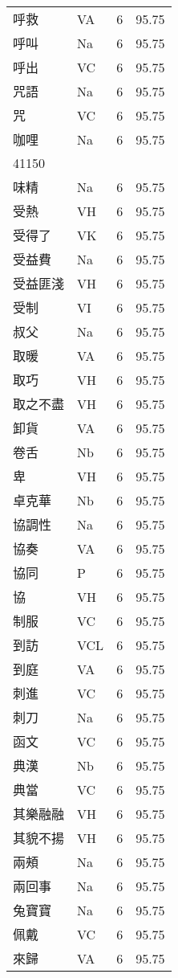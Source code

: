 \documentclass[twocolumn]{book}
\begin{document}
\begin{supertabular}{llrr}
呼救 & VA & 6 &  95.75\\
呼叫 & Na & 6 &  95.75\\
呼出 & VC & 6 &  95.75\\
咒語 & Na & 6 &  95.75\\
咒 & VC & 6 &  95.75\\
咖哩 & Na & 6 &  95.75\\
41150\\
味精 & Na & 6 &  95.75\\
受熱 & VH & 6 &  95.75\\
受得了 & VK & 6 &  95.75\\
受益費 & Na & 6 &  95.75\\
受益匪淺 & VH & 6 &  95.75\\
受制 & VI & 6 &  95.75\\
叔父 & Na & 6 &  95.75\\
取暖 & VA & 6 &  95.75\\
取巧 & VH & 6 &  95.75\\
取之不盡 & VH & 6 &  95.75\\
卸貨 & VA & 6 &  95.75\\
卷舌 & Nb & 6 &  95.75\\
卑 & VH & 6 &  95.75\\
卓克華 & Nb & 6 &  95.75\\
協調性 & Na & 6 &  95.75\\
協奏 & VA & 6 &  95.75\\
協同 & P & 6 &  95.75\\
協 & VH & 6 &  95.75\\
制服 & VC & 6 &  95.75\\
到訪 & VCL & 6 &  95.75\\
到庭 & VA & 6 &  95.75\\
刺進 & VC & 6 &  95.75\\
刺刀 & Na & 6 &  95.75\\
函文 & VC & 6 &  95.75\\
典漢 & Nb & 6 &  95.75\\
典當 & VC & 6 &  95.75\\
其樂融融 & VH & 6 &  95.75\\
其貌不揚 & VH & 6 &  95.75\\
兩頰 & Na & 6 &  95.75\\
兩回事 & Na & 6 &  95.75\\
兔寶寶 & Na & 6 &  95.75\\
佩戴 & VC & 6 &  95.75\\
來歸 & VA & 6 &  95.75\\

\end{supertabular}
\end{document}
